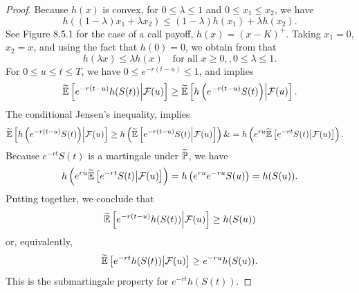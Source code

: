 \begin{proof}
	Because $h(x)$ is convex, for $0 \le \lambda \le 1$ and $0 \le x_1 \le x_2$, we have
	\begin{equation}
		h((1-\lambda)x_1 + \lambda x_2) \le (1-\lambda)h(x_1) + \lambda h(x_2). \label{eq:ConvexityInequalityForH}
	\end{equation}
	See Figure 8.5.1 for the case of a call payoff, $h(x) = (x-K)^+$.
	Taking $x_1 = 0$, $x_2 = x$, and using the fact that $h(0) = 0$, we obtain from  that
	\begin{equation}
		h(\lambda x) \le \lambda h(x) \quad \text{for all } x \ge 0, , 0 \le \lambda \le 1. \label{eq:ScalingInequalityForConvexH}
	\end{equation}
	For $0 \le u \le t \le T$, we have $0 \le e^{-r(t-u)} \le 1$, and  implies
	\begin{equation}
		\widetilde{\mathbb{E}}\left[e^{-r(t-u)}h(S(t)) \middle| \mathcal{F}(u)\right] \ge \widetilde{\mathbb{E}}\left[h\left(e^{-r(t-u)}S(t)\right) \middle| \mathcal{F}(u)\right]. \label{eq:ConditionalExpectationMonotonicity}
	\end{equation}
	The conditional Jensen's inequality,  implies
	\begin{equation}
		\begin{aligned}
			\widetilde{\mathbb{E}}\left[h\left(e^{-r(t-u)}S(t)\right) \middle| \mathcal{F}(u)\right] & \ge h\left(\widetilde{\mathbb{E}}\left[e^{-r(t-u)}S(t) \middle| \mathcal{F}(u)\right]\right) \& = h\left(e^{ru}\widetilde{\mathbb{E}}\left[e^{-rt}S(t) \middle| \mathcal{F}(u)\right]\right).
		\end{aligned}
		\label{eq:ConditionalJensenInequality}
	\end{equation}
	Because $e^{-rt}S(t)$ is a martingale under $\widetilde{\mathbb{P}}$, we have
	\begin{equation}
		h\left(e^{ru}\widetilde{\mathbb{E}}\left[e^{-rt}S(t) \middle| \mathcal{F}(u)\right]\right) = h\left(e^{ru}e^{-ru}S(u)\right) = h(S(u)). \label{eq:MartingaleSubstitutionStep}
	\end{equation}
	Putting  together, we conclude that
	\begin{equation}
		\widetilde{\mathbb{E}}\left[e^{-r(t-u)}h(S(t)) \middle| \mathcal{F}(u)\right] \ge h(S(u)) \label{eq:PreDiscountedSubmartingaleInequality}
	\end{equation}
	or, equivalently,
	\begin{equation}
		\widetilde{\mathbb{E}}\left[e^{-rt}h(S(t)) \middle| \mathcal{F}(u)\right] \ge e^{-ru}h(S(u)). \label{eq:DiscountedIntrinsicSubmartingaleProperty}
	\end{equation}
	This is the submartingale property for $e^{-rt}h(S(t))$.
\end{proof}

